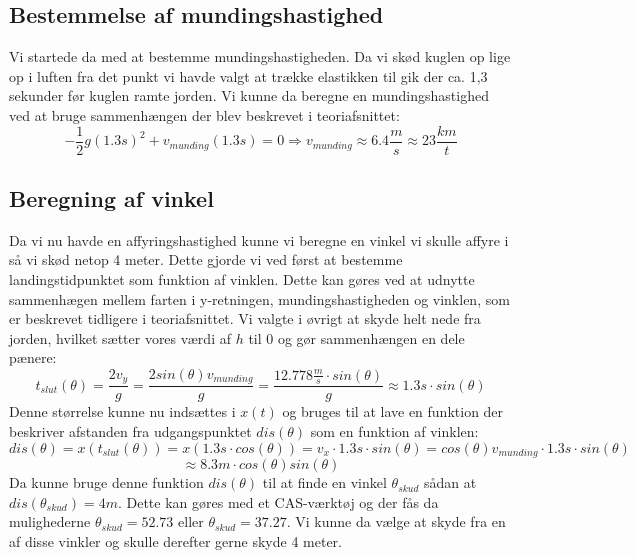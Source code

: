 \documentclass[12pt,a4paper]{article}
\theoremstyle{break}
\theoremstyle{nonumberplain}
\begin{document}
\subsection{Bestemmelse af mundingshastighed}
Vi startede da med at bestemme mundingshastigheden. 
Da vi skød kuglen op lige op i luften fra det punkt vi havde valgt at trække elastikken til gik der ca. 1,3 sekunder før kuglen ramte jorden. 
Vi kunne da beregne en mundingshastighed ved at bruge sammenhængen der blev beskrevet i teoriafsnittet:
$$-\frac{1}{2}g(1.3s)^2 + v_{munding}(1.3 s)=0 \Rightarrow v_{munding}\approx6.4 \frac{m}{s}\approx 23 \frac{km}{t}$$

\subsection{Beregning af vinkel}
Da vi nu havde en affyringshastighed kunne vi beregne en vinkel vi skulle affyre i så vi skød netop 4 meter. 
Dette gjorde vi ved først at bestemme landingstidpunktet som funktion af vinklen. 
Dette kan gøres ved at udnytte sammenhægen mellem farten i y-retningen, mundingshastigheden og vinklen, som er beskrevet tidligere i teoriafsnittet. 
Vi valgte i øvrigt at skyde helt nede fra jorden, hvilket sætter vores værdi af $h$ til $0$ og gør sammenhængen en dele pænere:
$$t_{slut}(\theta)=\dfrac{2v_y}{g}=\dfrac{2sin(\theta )v_{munding}}{g}=\dfrac{12.778\frac{m}{s}\cdot sin(\theta )}{g}\approx 1.3 s \cdot sin(\theta)$$
Denne størrelse kunne nu indsættes i $x(t)$ og bruges til at lave en funktion der beskriver afstanden fra udgangspunktet $dis(\theta)$ som en funktion af vinklen: 
$$dis(\theta) = x(t_{slut}(\theta))=x(1.3 s \cdot cos(\theta))=v_x \cdot 1.3 s \cdot sin(\theta)=cos(\theta)v_{munding}\cdot 1.3 s \cdot sin(\theta)$$
$$\approx 8.3 m \cdot cos(\theta) sin(\theta)$$
Da kunne bruge denne funktion $dis(\theta)$ til at finde en vinkel $\theta_{skud}$ sådan at $dis(\theta_{skud})=4m$.
Dette kan gøres med et CAS-værktøj og der fås da mulighederne $\theta_{skud} = 52.73$ eller $\theta_{skud} = 37.27$.
Vi kunne da vælge at skyde fra en af disse vinkler og skulle derefter gerne skyde 4 meter. 
\end{document}

